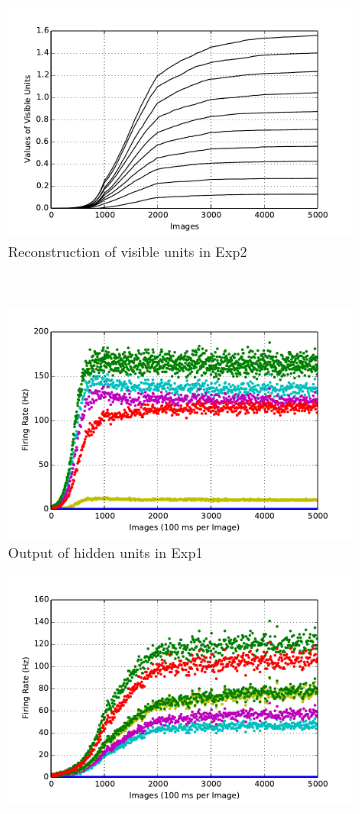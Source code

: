 \begin{figure}
\begin{subfigure}[t]{0.4\textwidth}
			\includegraphics[width=\textwidth]{pics_ae/exp2_recon_nons_decay.pdf}
			\caption{Reconstruction of visible units in Exp2}
		\end{subfigure}\\
		\begin{subfigure}[t]{0.4\textwidth}
			\includegraphics[width=\textwidth]{pics_ae/exp1_hid_s_decay.pdf}
			\caption{Output of hidden units in Exp1}
		\end{subfigure}
		\begin{subfigure}[t]{0.4\textwidth}
			\includegraphics[width=\textwidth]{pics_ae/exp2_hid_s_decay.pdf}

\end{subfigure}
\end{figure}

